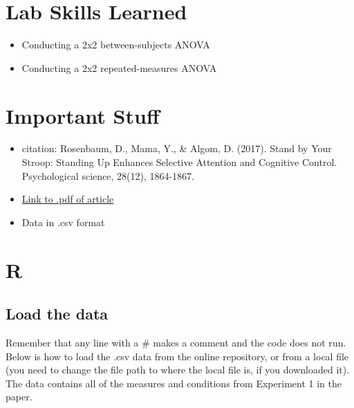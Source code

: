 \documentclass[
]{book}
\providecommand{\tightlist}{%
  \setlength{\itemsep}{0pt}\setlength{\parskip}{0pt}}
\begin{document}
\hypertarget{lab-skills-learned-4}{%
\section{Lab Skills Learned}\label{lab-skills-learned-4}}

\begin{itemize}
\tightlist
\item
  Conducting a 2x2 between-subjects ANOVA
\item
  Conducting a 2x2 repeated-measures ANOVA
\end{itemize}

\hypertarget{important-stuff-4}{%
\section{Important Stuff}\label{important-stuff-4}}

\begin{itemize}
\tightlist
\item
  citation: Rosenbaum, D., Mama, Y., \& Algom, D. (2017). Stand by Your
  Stroop: Standing Up Enhances Selective Attention and Cognitive
  Control. Psychological science, 28(12), 1864-1867.
\item
  \href{https://www.researchgate.net/profile/David_Rosenbaum6/publication/320070495_Stand_by_Your_Stroop_Standing_Up_Enhances_Selective_Attention_and_Cognitive_Control/links/5a82b4f10f7e9bda869fac5b/Stand-by-Your-Stroop-Standing-Up-Enhances-Selective-Attention-and-Cognitive-Control.pdf}{Link to .pdf of
  article}
\item
  Data
  in .csv format
\end{itemize}

\hypertarget{r-10}{%
\section{R}\label{r-10}}

\hypertarget{load-the-data-4}{%
\subsection{Load the data}\label{load-the-data-4}}

Remember that any line with a \# makes a comment and the code does not
run. Below is how to load the .csv data from the online repository, or
from a local file (you need to change the file path to where the local
file is, if you downloaded it). The data contains all of the measures
and conditions from Experiment 1 in the paper.
\end{document}
